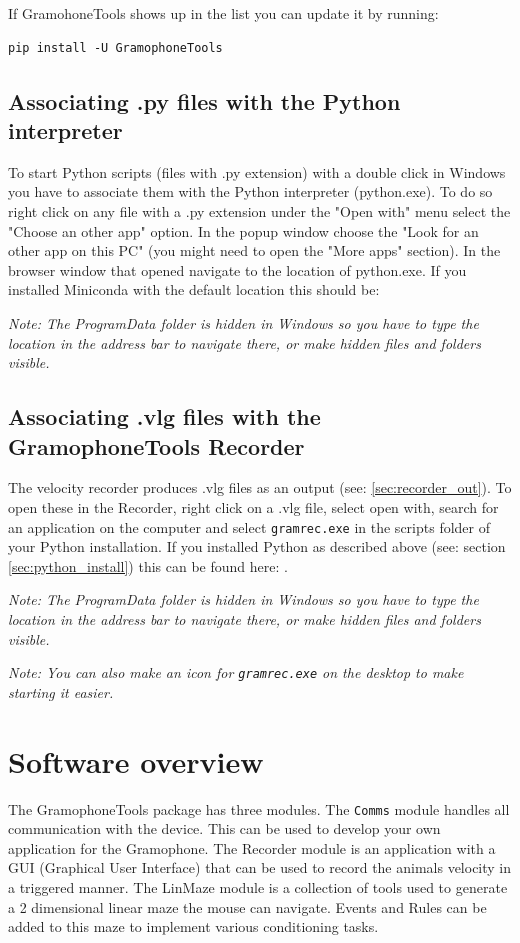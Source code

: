 \documentclass[11pt,a4paper]{article}
\newcommand{\note}[1]{\textit{Note: {#1}}}
\begin{document}
If GramohoneTools shows up in the list you can update it by running:
\begin{verbatim}
pip install -U GramophoneTools
\end{verbatim}

\subsection{Associating .py files with the Python interpreter}
To start Python scripts (files with .py extension) with a double click in Windows you have to associate them with the Python interpreter (python.exe). To do so right click on any file with a .py extension under the "Open with" menu select the "Choose an other app" option. In the popup window choose the "Look for an other app on this PC" (you might need to open the "More apps" section). In the browser window that opened navigate to the location of python.exe. If you installed Miniconda with the default location this should be: 

\note{The ProgramData folder is hidden in Windows so you have to type the location in the address bar to navigate there, or make hidden files and folders visible.}

\subsection{Associating .vlg files with the GramophoneTools Recorder}
The velocity recorder produces .vlg files as an output (see: \ref{sec:recorder_out}). To open these in the Recorder, right click on a .vlg file, select open with, search for an application on the computer and select \texttt{gramrec.exe} in the scripts folder of your Python installation. If you installed Python as described above (see: section \ref{sec:python_install}) this can be found here: .

\note{The ProgramData folder is hidden in Windows so you have to type the location in the address bar to navigate there, or make hidden files and folders visible.}

\note{You can also make an icon for \texttt{gramrec.exe} on the desktop to make starting it easier.}

\section{Software overview}
The GramophoneTools package has three modules. The \texttt{Comms} module handles all communication with the device. This can be used to develop your own application for the Gramophone. The Recorder module is an application with a GUI (Graphical User Interface) that can be used to record the animals velocity in a triggered manner. The LinMaze module is a collection of tools used to generate a 2 dimensional linear maze the mouse can navigate. Events and Rules can be added to this maze to implement various conditioning tasks.
\end{document}
